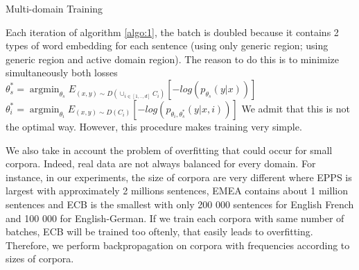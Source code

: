 \documentclass[11pt,a4paper]{article}
\DeclareMathOperator*{\argmin}{argmin}
\newcommand{\fyTodo}[1]{\Todo[FY:]{\textcolor{orange}{#1}}}
\begin{document}
\begin{algorithm}[h]
\caption{Multi-domain Training}
\label{algo:1}
\begin{algorithmic}[1]
\REPEAT 
{}
\end{algorithmic}
\end{algorithm}

Each iteration of algorithm \ref{algo:1}, the batch is doubled because it contains 2 types of word embedding for each sentence (using only generic region; using generic region and active domain region). The reason to do this is to minimize simultaneously both losses \\
$\theta^*_{s}=\displaystyle{\mathop{\argmin}_{\theta_s}}E_{(x,y) \sim D(\displaystyle{\mathop{\cup}_{i \in [1,..,d]}}C_{i})}[-log(p_{\theta_s}(y|x))]$ \\ 
$ \theta^*_{i}=\displaystyle{\mathop{\argmin}_{\theta_i}}E_{(x,y) \sim D(C_{i})}[-log(p_{\theta_i,\theta^*_s}(y|x,i))]
$ 
We admit that this is not the optimal way. However, this procedure makes training very simple.\fyTodo{Explain technicalities - future work ?}

We also take in account the problem of overfitting that could occur for small corpora. Indeed, real data are not always balanced for every domain. For instance, in our experiments, the size of corpora are very different where EPPS is largest with approximately 2 millions sentences, EMEA contains about 1 million sentences and ECB is the smallest with only 200 000 sentences for English French and 100 000 for English-German. If we train each corpora with same number of batches, ECB will be trained too oftenly, that easily leads to overfitting. Therefore, we perform backpropagation on corpora with frequencies according to sizes of corpora. \fyTodo{Refs on this ? or contrast ?}
\end{document}
